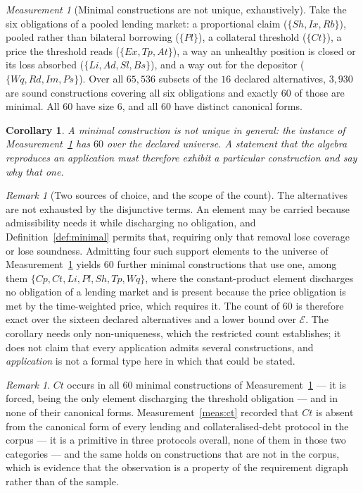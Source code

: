 \documentclass[11pt,reqno]{amsart}
\theoremstyle{plain}
\newtheorem{corollary}[theorem]{Corollary}
\theoremstyle{definition}
\theoremstyle{remark}
\newtheorem{measurement}[theorem]{Measurement}
\newtheorem{remark}[theorem]{Remark}
\newcommand{\El}{\mathcal{E}}
\begin{document}
\begin{measurement}[Minimal constructions are not unique, exhaustively]\label{meas:nonunique}
Take the six obligations of a pooled lending market: a proportional claim
($\{Sh,Ix,Rb\}$), pooled rather than bilateral borrowing ($\{Pl\}$), a
collateral threshold ($\{Ct\}$), a price the threshold reads
($\{Ex,Tp,At\}$), a way an unhealthy position is closed or its loss absorbed
($\{Li,Ad,Sl,Bs\}$), and a way out for the depositor ($\{Wq,Rd,Im,Ps\}$). Over
all $65{,}536$ subsets of the $16$ declared alternatives, $3{,}930$ are sound
constructions covering all six obligations and exactly $60$ of those are
minimal. All $60$ have size $6$, and all $60$ have distinct canonical forms.
\end{measurement}

\begin{corollary}\label{cor:notthe}
A minimal construction is not unique in general: the instance of
Measurement~\ref{meas:nonunique} has $60$ over the declared universe. A
statement that the algebra reproduces an application must therefore exhibit a
particular construction and say why that one.
\end{corollary}

\begin{remark}[Two sources of choice, and the scope of the count]
The alternatives are not exhausted by the disjunctive terms. An element may be
carried because admissibility needs it while discharging no obligation, and
Definition~\ref{def:minimal} permits that, requiring only that removal lose
coverage or lose soundness. Admitting four such support elements to the universe
of Measurement~\ref{meas:nonunique} yields $60$ further minimal constructions
that use one, among them $\{Cp,Ct,Li,Pl,Sh,Tp,Wq\}$, where the constant-product
element discharges no obligation of a lending market and is present because the
price obligation is met by the time-weighted price, which requires it. The count
of $60$ is therefore exact over the sixteen declared alternatives and a lower
bound over $\El$. The corollary needs only non-uniqueness, which the restricted
count establishes; it does not claim that every application admits several
constructions, and \emph{application} is not a formal type here in which that
could be stated.
\end{remark}

\begin{remark}
$Ct$ occurs in all $60$ minimal constructions of
Measurement~\ref{meas:nonunique} --- it is forced, being the only element
discharging the threshold obligation --- and in none of their canonical forms.
Measurement~\ref{meas:ct} recorded that $Ct$ is absent from the canonical form
of every lending and collateralised-debt protocol in the corpus --- it is a
primitive in three protocols overall, none of them in those two categories --- and
the same holds on constructions that are not in the corpus, which is evidence
that the observation is a property of the requirement digraph rather than of the
sample.
\end{remark}
\end{document}
